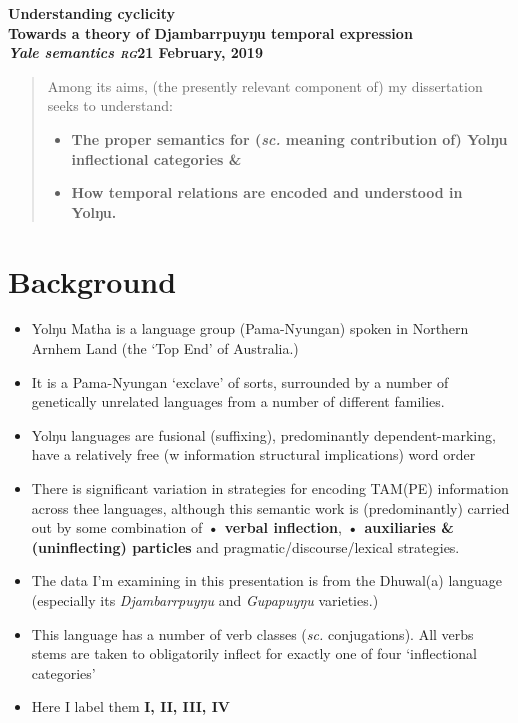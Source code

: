 \documentclass[11pt]{article}
\begin{document}
\noindent\textbf{\Large{Understanding cyclicity}\\
\large{Towards a theory of Djambarrpuyŋu temporal expression}\\
\small{\textit{Yale semantics \textsc{rg}}\hfill 21 February, 2019}}

\vspace*{3em}
\begin{abstract}
\noindent	Among its aims, (the presently relevant component of) my dissertation seeks to understand:
	

	\begin{itemize}
		\item \textbf{The proper semantics for (\textit{sc.} meaning contribution of) Yolŋu inflectional categories \&}
		\item \textbf{How temporal relations are encoded and understood in Yolŋu.}
\end{itemize}
\end{abstract}



\section*{Background}

\begin{itemize}
	\item Yolŋu Matha is a language group (Pama-Nyungan) spoken in Northern Arnhem Land (the `Top End' of Australia.)
	\item It is a Pama-Nyungan `exclave' of sorts, surrounded by a number of genetically unrelated languages from a number of different families.
	\item Yolŋu languages are fusional (suffixing), predominantly dependent-marking, have a relatively free (w information structural implications) word order 
	\item There is significant variation in strategies for encoding TAM(PE) information across thee languages, although this semantic work is (predominantly) carried out by some combination of \textbf{• verbal inflection}, \textbf{• auxiliaries \& (uninflecting) particles} and pragmatic/discourse/lexical strategies.
	\item The data I'm examining in this presentation is from the Dhuwal(a) language (especially its \textit{Djambarrpuyŋu} and \textit{Gupapuyŋu} varieties.)
	\item This language has a number of verb classes (\textit{sc. }conjugations). All verbs stems are taken to obligatorily inflect for exactly one of four `inflectional categories'
	\item Here I label them \textbf{I, II, III, IV}
\end{itemize}
\end{document}
